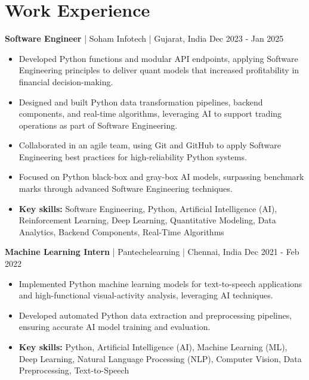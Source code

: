 \documentclass[a4paper,10pt]{article}
\begin{document}
\section*{Work Experience}
\textbf{Software Engineer} | Soham Infotech | Gujarat, India \hfill Dec 2023 - Jan 2025\par
\begin{itemize}
\item Developed Python functions and modular API endpoints, applying Software Engineering principles to deliver quant models that increased profitability in financial decision-making.
\item Designed and built Python data transformation pipelines, backend components, and real-time algorithms, leveraging AI to support trading operations as part of Software Engineering.
\item Collaborated in an agile team, using Git and GitHub to apply Software Engineering best practices for high-reliability Python systems.
\item Focused on Python black-box and gray-box AI models, surpassing benchmark marks through advanced Software Engineering techniques.
\item \textbf{Key skills:} Software Engineering, Python, Artificial Intelligence (AI), Reinforcement Learning, Deep Learning, Quantitative Modeling, Data Analytics, Backend Components, Real-Time Algorithms
\end{itemize}
\vspace{3pt}
\textbf{Machine Learning Intern} | Pantechelearning | Chennai, India \hfill Dec 2021 - Feb 2022\par
\begin{itemize}
\item Implemented Python machine learning models for text-to-speech applications and high-functional visual-activity analysis, leveraging AI techniques.
\item Developed automated Python data extraction and preprocessing pipelines, ensuring accurate AI model training and evaluation.
\item \textbf{Key skills:} Python, Artificial Intelligence (AI), Machine Learning (ML), Deep Learning, Natural Language Processing (NLP), Computer Vision, Data Preprocessing, Text-to-Speech
\end{itemize}
\vspace{3pt}
\end{document}
